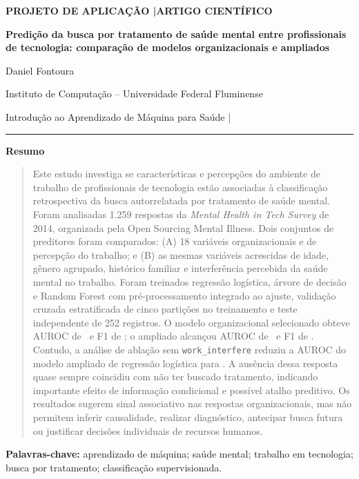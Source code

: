 \documentclass[11pt,a4paper]{article}
\begin{document}
\begin{center}
  {\sffamily\footnotesize\color{azulescuro}\bfseries PROJETO DE APLICAÇÃO \enspace|\enspace ARTIGO CIENTÍFICO}\par
  \vspace{0.65em}
  {\LARGE\sffamily\bfseries Predição da busca por tratamento de saúde mental entre profissionais de tecnologia: comparação de modelos organizacionais e ampliados}\par
  \vspace{0.85em}
  {\normalsize Daniel Fontoura}\par
  \vspace{0.15em}
  {\small Instituto de Computação -- Universidade Federal Fluminense}\par
  {\small\color{cinzasec} Introdução ao Aprendizado de Máquina para Saúde \enspace|}\par
  \vspace{0.85em}
  {\color{linha}\rule{\linewidth}{0.8pt}}
\end{center}
\vspace{-0.7em}

\begin{center}\textbf{\sffamily Resumo}\end{center}
\vspace{-0.85em}
\begin{quote}\small
Este estudo investiga se características e percepções do ambiente de trabalho de profissionais de tecnologia estão associadas à classificação retrospectiva da busca autorrelatada por tratamento de saúde mental. Foram analisadas 1.259 respostas da \textit{Mental Health in Tech Survey} de 2014, organizada pela Open Sourcing Mental Illness. Dois conjuntos de preditores foram comparados: (A) 18 variáveis organizacionais e de percepção do trabalho; e (B) as mesmas variáveis acrescidas de idade, gênero agrupado, histórico familiar e interferência percebida da saúde mental no trabalho. Foram treinados regressão logística, árvore de decisão e Random Forest com pré-processamento integrado ao ajuste, validação cruzada estratificada de cinco partições no treinamento e teste independente de 252 registros. O modelo organizacional selecionado obteve AUROC de \aucA\ e F1 de \fA; o ampliado alcançou AUROC de \aucB\ e F1 de \fB. Contudo, a análise de ablação sem \texttt{work\_interfere} reduziu a AUROC do modelo ampliado de regressão logística para \aucAbl. A ausência dessa resposta quase sempre coincidiu com não ter buscado tratamento, indicando importante efeito de informação condicional e possível atalho preditivo. Os resultados sugerem sinal associativo nas respostas organizacionais, mas não permitem inferir causalidade, realizar diagnóstico, antecipar busca futura ou justificar decisões individuais de recursos humanos.
\end{quote}
\vspace{-0.35em}
\noindent\textbf{Palavras-chave:} aprendizado de máquina; saúde mental; trabalho em tecnologia; busca por tratamento; classificação supervisionada.
\vspace{0.55em}
\end{document}
